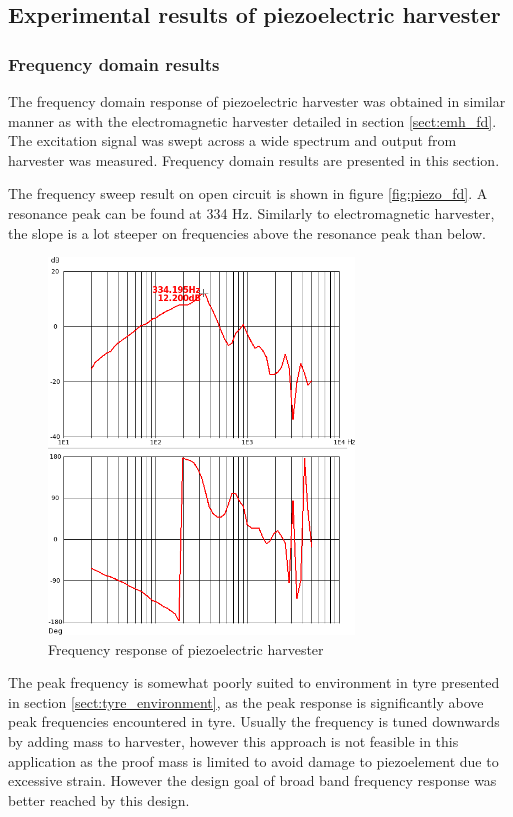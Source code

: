 \subsection{Experimental results of piezoelectric harvester}

\subsubsection{Frequency domain results} \label{sect:piezo_fd}
The frequency domain response of piezoelectric harvester was obtained in similar manner as with the electromagnetic harvester detailed in section \ref{sect:emh_fd}. The excitation signal was swept across a wide spectrum and output from harvester was measured. Frequency domain results are presented in this section.

The frequency sweep result on open circuit is shown in figure \ref{fig:piezo_fd}. A resonance peak can be found at 334 Hz. Similarly to electromagnetic harvester, the slope is a lot steeper on frequencies above the resonance peak than below. 

\begin{figure}[htb]
\begin{center}
\includegraphics[height=10cm]{images/own_measurement/generator_shaker/piezo_fd_open_2_3.png}
\end{center}
\caption{\label{fig:piezo_td_vi} Frequency response of piezoelectric harvester}
\end{figure}


The peak frequency is somewhat poorly suited to environment in tyre presented in section \ref{sect:tyre_environment}, as the peak response is significantly above peak frequencies encountered in tyre. Usually the frequency is tuned downwards by adding mass to harvester, however this approach is not feasible in this application as the proof mass is limited to avoid damage to piezoelement due to excessive strain. However the design goal of broad band frequency response was better reached by this design.

